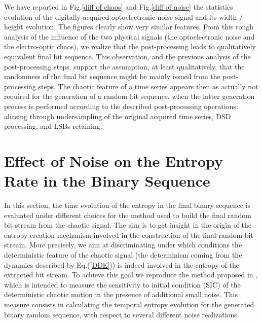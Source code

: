 We have reported in Fig.\ref{diff of chaos} and Fig.\ref{diff of noise}
the statistics evolution of the digitally acquired optoelectronic
noise signal and its width / height evolution. The figures clearly
show very similar features. From this rough analysis of the influence
of the two physical signals (the optoelectronic noise and the
electro-optic chaos), we realize that the post-processing leads to
qualitatively equivalent final bit sequence. This observation, and the
previous analysis of the post-processing steps, support the
assumption, at least qualitatively, that the randomness of the final
bit sequence might be mainly issued from the post-processing
steps. The chaotic feature of a time series appears then as actually
not required for the generation of a random bit sequence, when the
latter generation process is performed according to the described
post-processing operations: aliasing through undersampling of the
original acquired time series, DSD processing, and LSBs retaining.

\section{Effect of Noise on the Entropy Rate in the Binary Sequence}
\label{entropy}
%
In this section, the time evolution of the entropy in the final binary
sequence is evaluated under different choices for the method used to
build the final random bit stream from the chaotic signal. The aim is
to get insight in the origin of the entropy creation mechanism
involved in the construction of the final random bit stream. More
precisely, we aim at discriminating under which conditions the
deterministic feature of the chaotic signal (the determinism coming
from the dynamics described by Eq.(\ref{DDE})) is indeed involved in
the entropy of the extracted bit stream. To achieve this goal we
reproduce the method proposed in \cite{PhysRevE.85.016211}, which is
intended to measure the sensitivity to initial condition (SIC) of the
deterministic chaotic motion in the presence of additional small
noise. This measure consists in calculating the temporal entropy
evolution for the generated binary random sequence, with respect to
several different noise realizations.
%
